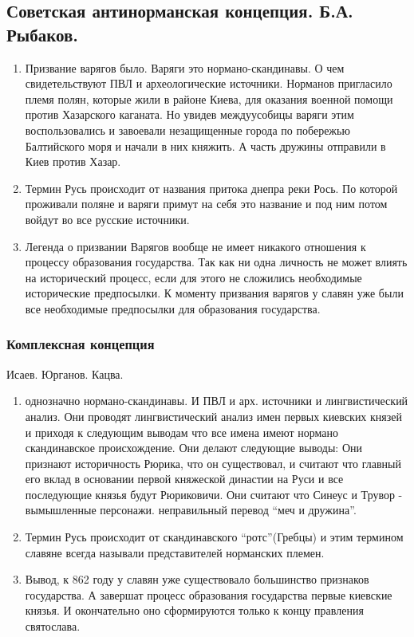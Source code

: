 \documentclass[a4paper]{article}
\begin{document}
\subsection{Советская антинорманская концепция. Б.А. Рыбаков.}
\begin{enumerate}
    \item Призвание варягов было. Варяги это нормано-скандинавы. О чем свидетельствуют ПВЛ и археологические источники. Норманов пригласило племя полян, которые жили в районе Киева, для оказания военной помощи против Хазарского каганата. Но увидев междуусобицы варяги этим воспользовались и завоевали незащищенные города по побережью Балтийского моря и начали в них княжить. А часть дружины отправили в Киев против Хазар.
    \item Термин Русь происходит от названия притока днепра реки Рось.
    По которой проживали поляне и варяги примут на себя это название и под ним потом войдут во все русские источники.
    \item Легенда о призвании Варягов вообще не имеет никакого отношения к процессу образования государства. Так как ни одна личность не может влиять на исторический процесс, если для этого не сложились необходимые исторические предпосылки. К моменту призвания варягов у славян уже были все необходимые предпосылки для образования государства.
\end{enumerate}

\subsubsection{Комплексная концепция}
Исаев. Юрганов. Кацва.
\begin{enumerate}
    \item однозначно нормано-скандинавы. И ПВЛ и арх. источники и лингвистический анализ. Они проводят лингвистический анализ имен первых киевских князей и приходя к следующим выводам что все имена имеют нормано скандинавское происхождение. Они делают следующие выводы:
    Они признают историчность Рюрика, что он существовал, и считают что главный его вклад в основании первой княжеской династии на Руси и все последующие князья будут Рюриковичи. Они считают что Синеус и Трувор - вымышленные персонажи. неправильный перевод ``меч и дружина''.
    \item
    Термин Русь происходит от скандинавского ``ротс''(Гребцы) и этим термином славяне всегда называли представителей норманских племен.
    \item Вывод, к 862 году у славян уже существовало большинство признаков государства. А завершат процесс образования государства первые киевские князья. И окончательно оно сформируются только к концу правления святослава.
\end{enumerate}
\end{document}
